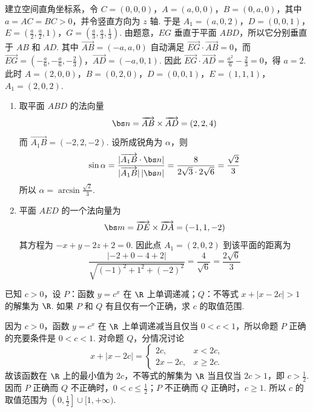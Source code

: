 \begin{solution}
建立空间直角坐标系，令 \(C=(0,0,0)\)，\(A=(a,0,0)\)，\(B=(0,a,0)\)，其中 \(a=AC=BC>0\)，并令竖直方向为 \(z\) 轴. 于是
\(A_1=(a,0,2)\)，\(D=(0,0,1)\)，\(E=\left(\frac a2,\frac a2,1\right)\)，\(G=\left(\frac a3,\frac a3,\frac13\right)\).
由题意，\(EG\) 垂直于平面 \(ABD\)，所以它分别垂直于 \(AB\) 和 \(AD\). 其中 \(\overrightarrow{AB}=(-a,a,0)\) 自动满足 \(\overrightarrow{EG}\cdot\overrightarrow{AB}=0\)，而
\(\overrightarrow{EG}=\left(-\frac a6,-\frac a6,-\frac23\right)\)，\(\overrightarrow{AD}=(-a,0,1)\).
因此 \(\overrightarrow{EG}\cdot\overrightarrow{AD}=\frac{a^2}{6}-\frac23=0\)，得 \(a=2\). 此时
\(A=(2,0,0)\)，\(B=(0,2,0)\)，\(D=(0,0,1)\)，\(E=(1,1,1)\)，\(A_1=(2,0,2)\).
\begin{enumerate}
\item 取平面 \(ABD\) 的法向量
\[
\bs n=\overrightarrow{AB}\times\overrightarrow{AD}=(2,2,4)
\]
而 \(\overrightarrow{A_1B}=(-2,2,-2)\). 设所成锐角为 \(\alpha\)，则
\[
\sin\alpha=\frac{|\overrightarrow{A_1B}\cdot\bs n|}{|\overrightarrow{A_1B}|\,|\bs n|}=\frac8{2\sqrt3\cdot2\sqrt6}=\frac{\sqrt2}{3}
\]
所以 \(\alpha=\arcsin\frac{\sqrt2}{3}\).
\item 平面 \(AED\) 的一个法向量为
\[
\bs m=\overrightarrow{DE}\times\overrightarrow{DA}=(-1,1,-2)
\]
其方程为 \(-x+y-2z+2=0\). 因此点 \(A_1=(2,0,2)\) 到该平面的距离为
\[
\frac{|-2+0-4+2|}{\sqrt{(-1)^2+1^2+(-2)^2}}=\frac4{\sqrt6}=\frac{2\sqrt6}{3}
\]
\end{enumerate}
\end{solution}

\begin{problem}
已知 \(c > 0\)，设 \(P\)：函数 \(y = c^{x}\) 在 \(\R\) 上单调递减；\(Q\)：不等式 \(x + |x - 2c| > 1\) 的解集为 \(\R\). 如果 \(P\) 和 \(Q\) 有且仅有一个正确，求 \(c\) 的取值范围.
\end{problem}

\begin{solution}
因为 \(c>0\)，函数 \(y=c^x\) 在 \(\R\) 上单调递减当且仅当 \(0<c<1\)，所以命题 \(P\) 正确的充要条件是 \(0<c<1\). 对命题 \(Q\)，分情况讨论
\[
x+|x-2c|=\begin{cases}
2c, & x<2c,\\
2x-2c, & x\geqslant2c.
\end{cases}
\]
故该函数在 \(\R\) 上的最小值为 \(2c\)，不等式的解集为 \(\R\) 当且仅当 \(2c>1\)，即 \(c>\frac12\). 因而 \(P\) 正确而 \(Q\) 不正确时，\(0<c\leqslant\frac12\)；\(P\) 不正确而 \(Q\) 正确时，\(c\geqslant1\). 所以 \(c\) 的取值范围为 \(\left(0,\frac12\right]\cup[1,+\infty)\).
\end{solution}

